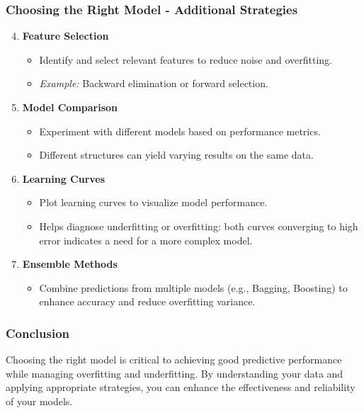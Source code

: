 \documentclass[aspectratio=169]{beamer}
\begin{document}
\begin{frame}[fragile]
    \frametitle{Choosing the Right Model - Additional Strategies}
    \begin{enumerate}
        \setcounter{enumi}{3}
        \item \textbf{Feature Selection}
        \begin{itemize}
            \item Identify and select relevant features to reduce noise and overfitting.
            \item \textit{Example:} Backward elimination or forward selection.
        \end{itemize}
        
        \item \textbf{Model Comparison}
        \begin{itemize}
            \item Experiment with different models based on performance metrics.
            \item Different structures can yield varying results on the same data.
        \end{itemize}
        
        \item \textbf{Learning Curves}
        \begin{itemize}
            \item Plot learning curves to visualize model performance.
            \item Helps diagnose underfitting or overfitting: both curves converging to high error indicates a need for a more complex model.
        \end{itemize}
        
        \item \textbf{Ensemble Methods}
        \begin{itemize}
            \item Combine predictions from multiple models (e.g., Bagging, Boosting) to enhance accuracy and reduce overfitting variance.
        \end{itemize}
    \end{enumerate}
\end{frame}

\begin{frame}[fragile]
    \frametitle{Conclusion}
    Choosing the right model is critical to achieving good predictive performance while managing overfitting and underfitting. By understanding your data and applying appropriate strategies, you can enhance the effectiveness and reliability of your models.
\end{frame}
\end{document}
